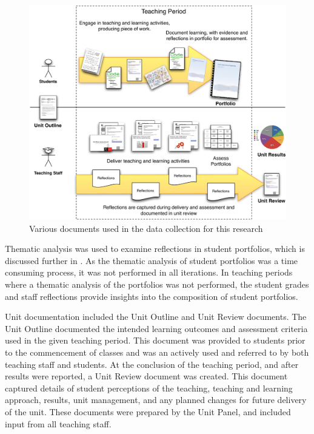 \begin{figure}[tbp]
  \centering
  \includegraphics[width=\textwidth]{ResearchData}
  \caption{Various documents used in the data collection for this research}
  \label{fig:research_data}
\end{figure}

Thematic analysis \cite{Braun:2006} was used to examine reflections in student portfolios, which is discussed further in . As the thematic analysis of student portfolios was a time consuming process, it was not performed in all iterations. In teaching periods where a thematic analysis of the portfolios was not performed, the student grades and staff reflections provide insights into the composition of student portfolios.

Unit documentation included the Unit Outline and Unit Review documents. The Unit Outline documented the intended learning outcomes and assessment criteria used in the given teaching period. This document was provided to students prior to the commencement of classes and was an actively used and referred to by both teaching staff and students. At the conclusion of the teaching period, and after results were reported, a Unit Review document was created. This document captured details of student perceptions of the teaching, teaching and learning approach, results, unit management, and any planned changes for future delivery of the unit. These documents were prepared by the Unit Panel, and included input from all teaching staff.

